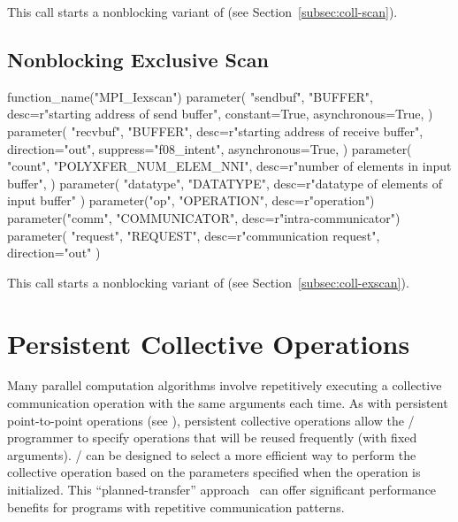 This call starts a nonblocking variant of  (see
Section~\ref{subsec:coll-scan}).

\subsection{Nonblocking Exclusive Scan}
\label{subsec:nbcoll-iexscan}

%
\begin{mpi-binding}
    function_name("MPI_Iexscan")
    parameter(
        "sendbuf",
        "BUFFER",
        desc=r"starting address of send buffer",
        constant=True,
        asynchronous=True,
    )
    parameter(
        "recvbuf",
        "BUFFER",
        desc=r"starting address of receive buffer",
        direction="out",
        suppress="f08_intent",
        asynchronous=True,
    )
    parameter(
        "count",
        "POLYXFER_NUM_ELEM_NNI",
        desc=r"number of elements in input buffer",
    )
    parameter(
        "datatype", "DATATYPE", desc=r"datatype of elements of input buffer"
    )
    parameter("op", "OPERATION", desc=r"operation")
    parameter("comm", "COMMUNICATOR", desc=r"intra-communicator")
    parameter(
        "request", "REQUEST", desc=r"communication request", direction="out"
    )
\end{mpi-binding}

This call starts a nonblocking variant of  (see
Section~\ref{subsec:coll-exscan}).


\section{Persistent Collective Operations}
\label{sec:coll-persistent}
\label{sec:pcoll}

Many parallel computation algorithms
involve repetitively executing
a collective communication operation
with the same arguments each time.
As with persistent point-to-point operations (see ),
persistent collective operations allow the \MPI/ programmer to specify operations
that will be reused frequently (with fixed arguments).
\MPI/ can be designed to select a more efficient
way to perform the collective operation
based on the parameters specified when the operation is initialized.
This ``planned-transfer'' approach~\cite{Morgan:2017:PPP:3127024.3127028,HOLMES201932} can offer significant performance benefits
for programs with repetitive communication patterns.

